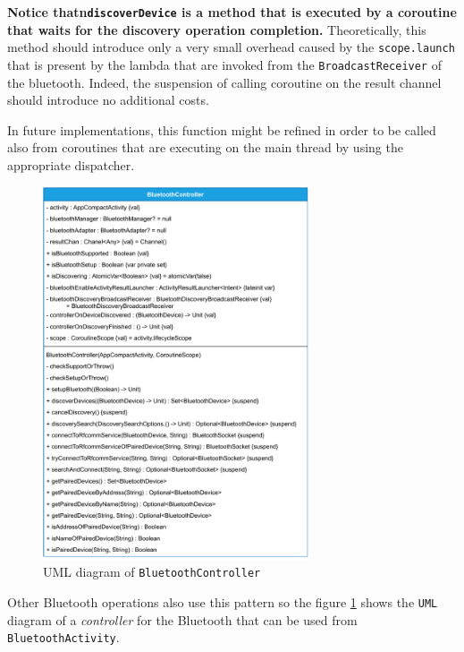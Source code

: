 \textbf{Notice thatn\texttt{discoverDevice} is a method that is executed by a coroutine that waits for the discovery operation completion.} Theoretically, this method should introduce only a very small overhead caused by the \texttt{scope.launch} that is present by the lambda that are invoked from the \texttt{BroadcastReceiver} of the bluetooth. Indeed, the suspension of calling coroutine on the result channel should introduce no additional costs.

In future implementations, this function might be refined in order to be called also from coroutines that are executing on the main thread by using the appropriate dispatcher.

\begin{figure}[h!]
	\centering
	\includegraphics[width=0.7\textwidth]{img/bluetoothcontroller_uml.pdf}
	\caption{UML diagram of \texttt{BluetoothController}}
	\label{fig:bluetoothcontroller_uml}
\end{figure}

Other Bluetooth operations also use this pattern so the figure \ref{fig:bluetoothcontroller_uml} shows the \texttt{UML} diagram of a \textit{controller} for the Bluetooth that can be used from \texttt{BluetoothActivity}.

